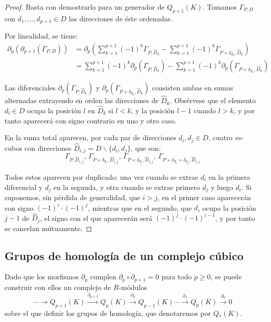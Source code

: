 \documentclass[12pt,a4paper,twoside]{article} %
\theoremstyle{plain}
\theoremstyle{definition}
\begin{document}
\begin{proof}
Basta con demostrarlo para un generador de $Q_{p+1}(K)$. Tomamos $\Gamma_{P,D}$ con $d_1,\dots,d_{p+1} \in D$ las direcciones de éste ordenadas.

Por linealidad, se tiene:
\begin{align*}
\partial_p(\partial_{p+1}(\Gamma_{P,D})) &= \partial_p \left( \sum_{k=1}^{p+1} (-1)^{k}\Gamma_{P,\hat{D}_k} - \sum_{k=1}^{p+1} (-1)^{k}\Gamma_{P+\delta_{d_k},\hat{D}_k} \right) \\
                                   &= \sum_{k=1}^{p+1} (-1)^{k} \partial_p \left( \Gamma_{P,\hat{D}_k} \right) - \sum_{k=1}^{p+1} (-1)^{k}\partial_p \left( \Gamma_{P+\delta_{d_k},\hat{D}_k} \right)
\end{align*}

Las diferenciales $\partial_p ( \Gamma_{P,\hat{D}_k} )$ y $\partial_p ( \Gamma_{P+\delta_{d_k},\hat{D}_k} )$ consisten ambas en sumas alternadas extrayendo en orden las direcciones de $\hat{D}_k$. Obsérvese que el elemento $d_l \in D$ ocupa la posición $l$ en $\hat{D}_k$ si $l < k$, y la posición $l-1$ cuando $l > k$, y por tanto aparecerá con signo contrario en uno y otro caso. 

En la suma total aparecen, por cada par de direcciones $d_i,d_j \in D$, cuatro $m$-cubos con direcciones $\hat{D}_{i,j}=D \backslash \{d_i,d_j\}$, que son:
$$\Gamma_{P,\hat{D}_{i,j}} , \, \Gamma_{P+\delta_{d_i},\hat{D}_{i,j}} , \, \Gamma_{P+\delta_{d_j},
\hat{D}_{i,j}} , \, \Gamma_{P+\delta_{d_i}+\delta_{d_j},\hat{D}_{i,j}}$$

Todos estos aparecen por duplicado: una vez cuando se extrae $d_i$ en la primera diferencial y $d_j$ en la segunda, y otra cuando se extrae primero $d_j$ y luego $d_i$. Si suponemos, sin pérdida de generalidad, que $i > j$, en el primer caso aparecerán con signo $(-1)^i\cdot (-1)^j$, mientras que en el segundo, que $d_i$ ocupa la posición $j-1$ de $\hat{D}_j$, el signo con el que aparecerán será $(-1)^j\cdot(-1)^{i-1}$, y por tanto se cancelan mútuamente.
\end{proof}

\subsection{Grupos de homología de un complejo cúbico}

Dado que los morfismos $\partial_p$ cumplen $\partial_p \circ \partial_{p+1} = 0$ para todo $p \geq 0$, se puede construir con ellos un complejo de $R$-módulos
$$ \cdots \longrightarrow Q_{p+1}(K) \stackrel{\partial_{p+1}}{\longrightarrow} Q_p(K) \stackrel{\partial_p}{\longrightarrow} Q_{p-1}(K) \cdots \stackrel{\partial_1}{\longrightarrow} Q_0(K) \stackrel{\partial_0}{\longrightarrow} 0 $$
sobre el que definir los grupos de homología, que denotaremos por $Q_*(K)$.
\end{document}
